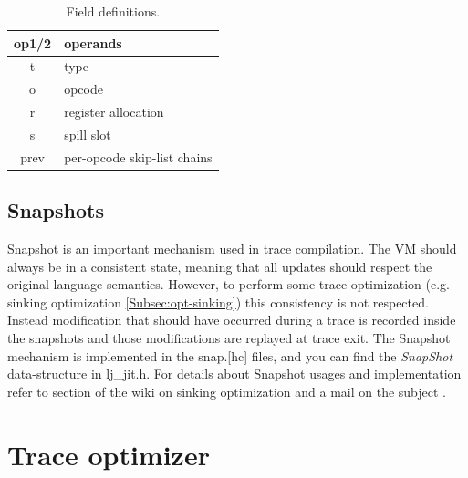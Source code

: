 \begin{table}[H]
\centering
\caption{Field definitions.}
\label{tab:ir-field}
\begin{tabular}{|c|l|}
\hline
op1/2 & operands                    \\ \hline
t     & type                        \\ \hline
o     & opcode                      \\ \hline
r     & register allocation         \\ \hline
s     & spill slot                  \\ \hline
prev  & per-opcode skip-list chains \\ \hline
\end{tabular}
\end{table}


\subsection{Snapshots}
\label{Subsec:snap}

Snapshot is an important mechanism used in trace compilation. The VM should
always be in a consistent state, meaning that all updates should respect the
original language semantics. However, to perform some trace optimization
(e.g. sinking optimization \ref{Subsec:opt-sinking}) this consistency is not respected. Instead
modification that should have occurred during a trace is recorded inside the
snapshots and those modifications are replayed at trace exit. The Snapshot
mechanism is implemented in the snap.[hc] files, and you can find the
\emph{SnapShot} data-structure in lj\_jit.h. For details about
Snapshot usages and implementation refer to section of the wiki on sinking
optimization \cite{luajit-sink} and a mail on the subject \cite{luajit-mail-1}.




\section{Trace optimizer}
\label{Sec:TO}

